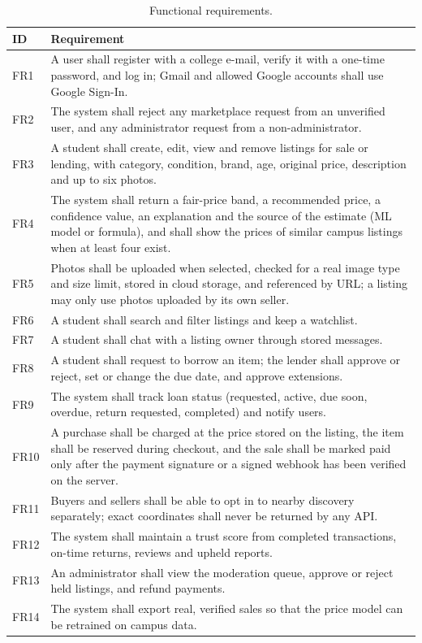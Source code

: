 \documentclass[12pt,letterpaper,twoside,openany]{report}
\begin{document}
\begin{table}[H]
\centering
\caption{Functional requirements.}\label{tab:fr}
\small
\begin{tabularx}{\textwidth}{@{}L{1.0cm}X@{}}
\toprule
\textbf{ID} & \textbf{Requirement}\\
\midrule
FR1 & A user shall register with a college e-mail, verify it with a one-time password, and log in; Gmail and
allowed Google accounts shall use Google Sign-In.\\
FR2 & The system shall reject any marketplace request from an unverified user, and any administrator
request from a non-administrator.\\
FR3 & A student shall create, edit, view and remove listings for sale or lending, with category, condition,
brand, age, original price, description and up to six photos.\\
FR4 & The system shall return a fair-price band, a recommended price, a confidence value, an explanation
and the source of the estimate (ML model or formula), and shall show the prices of similar campus
listings when at least four exist.\\
FR5 & Photos shall be uploaded when selected, checked for a real image type and size limit, stored in cloud
storage, and referenced by URL; a listing may only use photos uploaded by its own seller.\\
FR6 & A student shall search and filter listings and keep a watchlist.\\
FR7 & A student shall chat with a listing owner through stored messages.\\
FR8 & A student shall request to borrow an item; the lender shall approve or reject, set or change the due
date, and approve extensions.\\
FR9 & The system shall track loan status (requested, active, due soon, overdue, return requested,
completed) and notify users.\\
FR10 & A purchase shall be charged at the price stored on the listing, the item shall be reserved during
checkout, and the sale shall be marked paid only after the payment signature or a signed webhook has
been verified on the server.\\
FR11 & Buyers and sellers shall be able to opt in to nearby discovery separately; exact coordinates shall
never be returned by any API.\\
FR12 & The system shall maintain a trust score from completed transactions, on-time returns, reviews and
upheld reports.\\
FR13 & An administrator shall view the moderation queue, approve or reject held listings, and refund
payments.\\
FR14 & The system shall export real, verified sales so that the price model can be retrained on campus
data.\\
\bottomrule
\end{tabularx}
\end{table}
\end{document}
